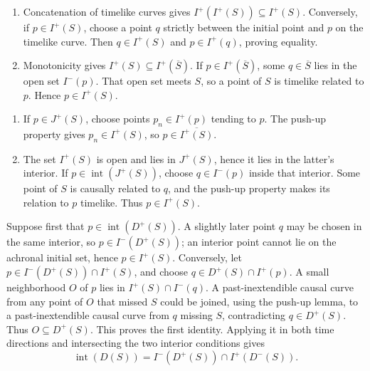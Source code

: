 \ExerciseEditorialNote

\begin{enumerate}[leftmargin=2.8em,itemsep=1.2em]
\begin{enumerate}[label=\alph*),leftmargin=2em]
\item Concatenation of timelike curves gives
\(I^+(I^+(S))\subseteq I^+(S)\).  Conversely, if \(p\in I^+(S)\), choose a
point \(q\) strictly between the initial point and \(p\) on the timelike
curve.  Then \(q\in I^+(S)\) and \(p\in I^+(q)\), proving equality.

\item Monotonicity gives \(I^+(S)\subseteq I^+(\overline S)\).  If
\(p\in I^+(\overline S)\), some \(q\in\overline S\) lies in the open set
\(I^-(p)\).  That open set meets \(S\), so a point of \(S\) is timelike
related to \(p\).  Hence \(p\in I^+(S)\).
\end{enumerate}

\begin{enumerate}[label=\alph*),leftmargin=2em]
\item If \(p\in J^+(S)\), choose points \(p_n\in I^+(p)\) tending to \(p\).
The push-up property gives \(p_n\in I^+(S)\), so
\(p\in\overline{I^+(S)}\).

\item The set \(I^+(S)\) is open and lies in \(J^+(S)\), hence it lies in
the latter's interior.  If \(p\in\operatorname{int}(J^+(S))\), choose
\(q\in I^-(p)\) inside that interior.  Some point of \(S\) is causally
related to \(q\), and the push-up property makes its relation to \(p\)
timelike.  Thus \(p\in I^+(S)\).
\end{enumerate}

Suppose first that \(p\in\operatorname{int}(D^+(S))\).  A slightly later
point \(q\) may be chosen in the same interior, so
\(p\in I^-(D^+(S))\); an interior point cannot lie on the achronal initial
set, hence \(p\in I^+(S)\).  Conversely, let
\(p\in I^-(D^+(S))\cap I^+(S)\), and choose \(q\in D^+(S)\cap I^+(p)\).
A small neighborhood \(O\) of \(p\) lies in
\(I^+(S)\cap I^-(q)\).  A past-inextendible causal curve from any point of
\(O\) that missed \(S\) could be joined, using the push-up lemma, to a
past-inextendible causal curve from \(q\) missing \(S\), contradicting
\(q\in D^+(S)\).  Thus \(O\subseteq D^+(S)\).  This proves the first
identity.  Applying it in both time directions and intersecting the two
interior conditions gives
\[
 \operatorname{int}(D(S))
 =I^-(D^+(S))\cap I^+(D^-(S)).
\]


\end{enumerate}

